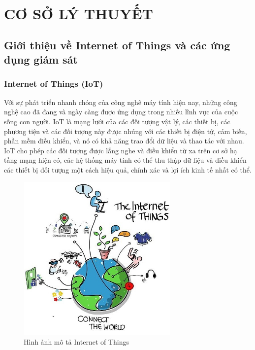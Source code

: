 
\chapter{CƠ SỞ LÝ THUYẾT}

\ifpdf
    \graphicspath{{Chapter2/Figs/Raster/}{Chapter2/Figs/PDF/}{Chapter2/Figs/}{Chapter2/Figs/web/}}
\else
    \graphicspath{{Chapter2/Figs/Vector/}{Chapter2/Figs/}}
\fi


\section{Giới thiệu về Internet of Things và các ứng dụng giám sát}
\subsection{Internet of Things (IoT)}\label{sec:xuhuongiot}
Với sự phát triển nhanh chóng của công nghê máy tính hiện nay, những công nghệ cao đã đang và ngày càng được ứng dụng trong nhiều lĩnh vực của cuộc sống con người. IoT là mạng lưới của các đối tượng vật lý, các thiết bị, các phương tiện và các đối tượng này được nhúng với các thiết bị điện tử, cảm biến, phần mềm điều khiển, và nó có khả năng trao đổi dữ liệu và thao tác với nhau. IoT cho phép các đối tượng được lắng nghe và điều khiển từ xa trên cơ sở hạ tầng mạng hiện có, các hệ thống máy tính có thể thu thập dữ liệu và điều khiển các thiết bị đối tượng một cách hiệu quả, chính xác và lợi ích kinh tế nhất có thể. 
\begin{figure}[H] 
\centering    
\includegraphics[width=0.7\textwidth]{pic4}
\caption[Hình ảnh mô tả Internet of Things]{Hình ảnh mô tả Internet of Things}
\label{fig:pic4}
\end{figure}


